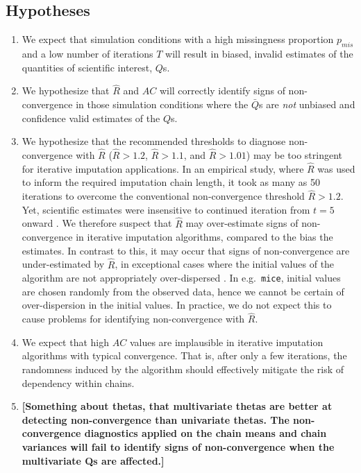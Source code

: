 \documentclass[Royal,times,sageh]{sagej}
\begin{document}
\hypertarget{hypotheses}{%
\subsection{Hypotheses}\label{hypotheses}}

\begin{enumerate}
\def\labelenumi{\arabic{enumi}.}
\item
  We expect that simulation conditions with a high missingness proportion \(p_{mis}\) and a low number of iterations \(T\) will result in biased, invalid estimates of the quantities of scientific interest, \(Q\)s.
\item
  We hypothesize that \(\widehat{R}\) and \(AC\) will correctly identify signs of non-convergence in those simulation conditions where the \(\bar{Q}\)s are \emph{not} unbiased and confidence valid estimates of the \(Q\)s.
\item
  We hypothesize that the recommended thresholds to diagnose non-convergence with \(\widehat{R}\) (\(\widehat{R} > 1.2\), \(\widehat{R} > 1.1\), and \(\widehat{R} > 1.01\)) may be too stringent for iterative imputation applications. In an empirical study, where \(\widehat{R}\) was used to inform the required imputation chain length, it took as many as 50 iterations to overcome the conventional non-convergence threshold \(\widehat{R}>1.2\). Yet, scientific estimates were insensitive to continued iteration from \(t=5\) onward \citep{lace07}. We therefore suspect that \(\widehat{R}\) may over-estimate signs of non-convergence in iterative imputation algorithms, compared to the bias the estimates. In contrast to this, it may occur that signs of non-convergence are under-estimated by \(\widehat{R}\), in exceptional cases where the initial values of the algorithm are not appropriately over-dispersed \citep[p.~437]{broo98}. In e.g.~\texttt{mice}, initial values are chosen randomly from the observed data, hence we cannot be certain of over-dispersion in the initial values. In practice, we do not expect this to cause problems for identifying non-convergence with \(\widehat{R}\).
\item
  We expect that high \(AC\) values are implausible in iterative imputation algorithms with typical convergence. That is, after only a few iterations, the randomness induced by the algorithm should effectively mitigate the risk of dependency within chains.
\item
  \textbf{{[}Something about thetas, that multivariate thetas are better at detecting non-convergence than univariate thetas. The non-convergence diagnostics applied on the chain means and chain variances will fail to identify signs of non-convergence when the multivariate Qs are affected.{]}}
\end{enumerate}
\end{document}
